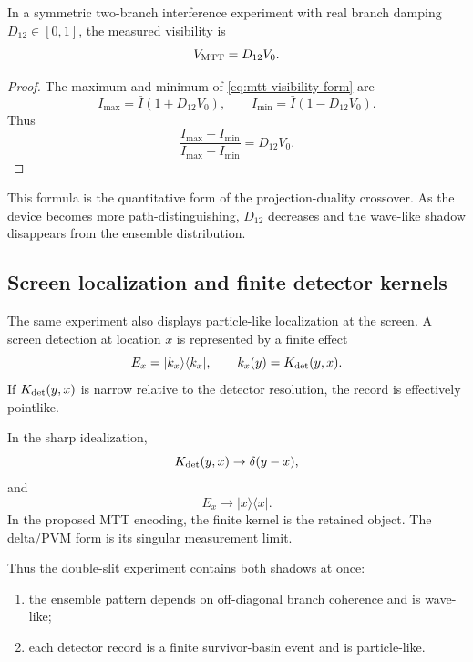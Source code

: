\documentclass[11pt]{article}
\begin{document}
\begin{proposition}
\label{prop:visibility-reduction}
In a symmetric two-branch interference experiment with real branch damping \(D_{12}\in[0,1]\),
the measured visibility is
\begin{equation}
  V_{\rm MTT}=D_{12}V_0.
\end{equation}
\end{proposition}

\begin{proof}
The maximum and minimum of \eqref{eq:mtt-visibility-form} are
\begin{equation}
  I_{\max}=\bar I(1+D_{12}V_0),
  \qquad
  I_{\min}=\bar I(1-D_{12}V_0).
\end{equation}
Thus
\begin{equation}
  \frac{I_{\max}-I_{\min}}{I_{\max}+I_{\min}}
  =
  D_{12}V_0.
\end{equation}
\end{proof}

This formula is the quantitative form of the projection-duality crossover. As the device
becomes more path-distinguishing, \(D_{12}\) decreases and the wave-like shadow disappears
from the ensemble distribution.

\subsection{Screen localization and finite detector kernels}
\label{subsec:screen-localization}

The same experiment also displays particle-like localization at the screen. A screen detection
at location \(x\) is represented by a finite effect
\begin{equation}
  E_x=|k_x\rangle\langle k_x|,
  \qquad
  k_x(y)=K_{\rm det}(y,x).
\end{equation}
If \(K_{\rm det}(y,x)\) is narrow relative to the detector resolution, the record is effectively
pointlike.

In the sharp idealization,
\begin{equation}
  K_{\rm det}(y,x)\to\delta(y-x),
\end{equation}
and
\begin{equation}
  E_x\to |x\rangle\langle x|.
\end{equation}
In the proposed MTT encoding, the finite kernel is the retained object. The delta/PVM form
is its singular measurement limit.

Thus the double-slit experiment contains both shadows at once:
\begin{enumerate}[label=(\roman*)]
  \item the ensemble pattern depends on off-diagonal branch coherence and is wave-like;
  \item each detector record is a finite survivor-basin event and is particle-like.
\end{enumerate}
\end{document}
